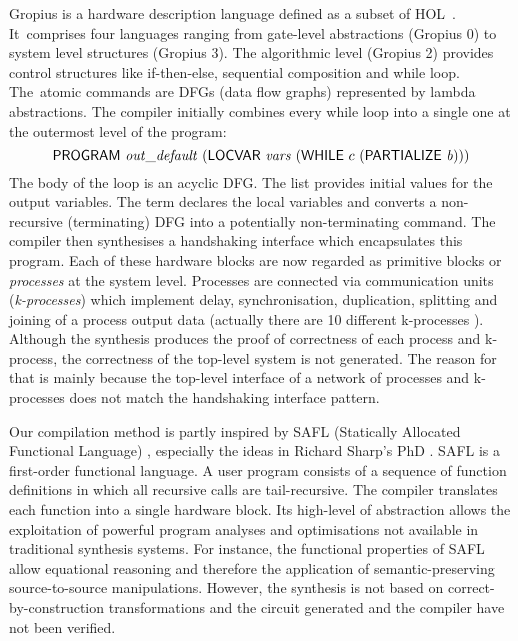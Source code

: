 

Gropius is a hardware description language
defined as a subset of HOL~\mbox{\cite{Blu01,Gropius1,BS99,Gropius2}}.
It~comprises four languages ranging
from gate-level abstractions (Gropius 0) to 
system level structures (Gropius 3).
The algorithmic level (Gropius 2)
provides control structures like if-then-else,
sequential composition and while loop.
The~atomic commands are DFGs (data flow
graphs) represented by lambda abstractions.
The compiler initially combines every while loop into
a single one at the outermost level of the
program:
\[
\DEF{PROGRAM}\ \VAR{out\_default}\ (\DEF{LOCVAR}\ \VAR{vars}\ 
(\DEF{WHILE}\ c\ (\DEF{PARTIALIZE}\ \VAR{b})))
\]
The body  of the  loop is an acyclic %
DFG. The list \VAR{out\_default}
provides initial values for the output variables.
The term  declares the local variables
 and  converts a
non-recursive (terminating) DFG into a potentially
non-terminating command.
The compiler then synthesises a handshaking
interface which encapsulates this program.
Each of these hardware blocks are now regarded
as primitive blocks or {\em processes\/} at the system level.
Processes are connected via communication
units ({\em k-processes\/}) which implement delay,
synchronisation, duplication,
splitting and joining of a process output data
(actually there  are 10 different k-processes \cite{Blu01}).
Although the synthesis produces the proof of
correctness of each process and k-process,
the correctness of the top-level system is not generated.
The reason for that is mainly because
the top-level interface of a network of processes and 
k-processes does not match the handshaking interface pattern.

Our compilation method is partly inspired by SAFL 
(Statically Allocated Functional Language) \cite{MS01b},
especially the ideas in Richard Sharp's PhD \cite{Sha02}. 
SAFL is a first-order functional language.
A user program consists of a sequence of function 
definitions in which all recursive calls are tail-recursive.
The compiler translates each function into
a single hardware block.
Its high-level of abstraction allows
the exploitation of powerful program analyses
and optimisations not available in traditional
synthesis systems. 
For instance, the functional properties of SAFL 
allow equational reasoning and therefore the
application of semantic-preserving 
source-to-source manipulations.
However, the synthesis is not based on
correct-by-construction transformations
and the circuit generated and the compiler
have not been verified.

